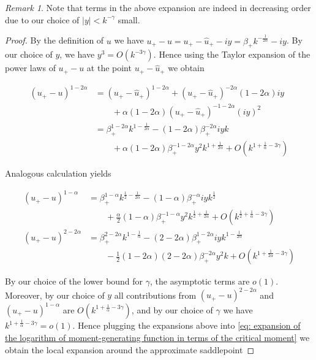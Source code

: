 \documentclass[12pt,twoside]{article}
\theoremstyle{plain}
\theoremstyle{plain}
\theoremstyle{definition}
\theoremstyle{remark}
\newtheorem{remark}[proposition]{Remark}
\numberwithin{equation}{section}
\begin{document}
\vspace{10pt}

\begin{remark}
Note that terms in the above expansion are indeed in decreasing order due to our choice of $|y|<k^{-\gamma}$ small.
\end{remark}

\newpage

\begin{proof}
By the definition of $u$ we have $u_+-u=u_+ - \hat u_+ - iy = \beta_+ k^{-\frac{1}{2\alpha}} - iy$. By our choice of $y$, we have $y^3=O(k^{-3\gamma})$. Hence using the Taylor expansion of the power laws of $u_+-u$ at the point $u_+-\hat u_+$ we obtain

\begin{align}
(u_+-u)^{1-2\alpha} &=
(u_+-\hat u_+)^{1-2\alpha} + (u_+-\hat u_+)^{-2\alpha} (1-2\alpha) iy \nonumber \\
&\qquad+\alpha(1-2\alpha)(u_+-\hat u_+)^{-1-2\alpha}(iy)^2 \nonumber \\[10pt]
&=\beta_+^{1-2\alpha}k^{1-\frac{1}{2\alpha}} - (1-2\alpha)\beta_+^{-2\alpha}iyk \label{eq: expansion of critical moment 1-2alpha} \\
&\qquad + \alpha(1-2\alpha)\beta_+^{-1-2\alpha}y^2 k^{1+\frac{1}{2\alpha}} + O(k^{1+\frac 1\alpha -3\gamma}) \nonumber 
\end{align}

Analogous calculation yields

\begin{align}
(u_+-u)^{1-\alpha} &= \beta_+^{1-\alpha}k^{\frac 12-\frac{1}{2\alpha}} - (1-\alpha) \beta_+^{-\alpha}iyk^{\frac 12} \\
&\qquad+\frac \alpha 2 (1-\alpha)\beta_+^{-1-\alpha}y^2 k^{\frac 12+\frac{1}{2\alpha}} + O(k^{\frac 12+\frac 1\alpha-3\gamma}) \nonumber \\[10pt]
(u_+-u)^{2-2\alpha} &= \beta_+^{2-2\alpha}k^{1-\frac{1}{\alpha}} - (2-2\alpha)\beta_+^{1-2\alpha}iyk^{1-\frac{1}{2\alpha}} \\
&\qquad-\frac 12 (1-2\alpha)(2-2\alpha)\beta_+^{-2\alpha}y^2k + O(k^{1+\frac {1}{2\alpha}-3\gamma}) \nonumber
\end{align}

By our choice of the lower bound for $\gamma$, the asymptotic terms are $o(1)$. Moreover, by our choice of $y$ all contributions from $(u_+-u)^{2-2\alpha}$ and $(u_+-u)^{1-\alpha}$ are $O(k^{1+\frac 1\alpha -3\gamma})$, and by our choice of $\gamma$ we have $k^{1+\frac 1\alpha -3\gamma}=o(1)$. Hence plugging the expansions above into \eqref{eq: expansion of the logarithm of moment-generating function in terms of the critical moment} we obtain the local expansion around the approximate saddlepoint


\end{proof}
\end{document}
